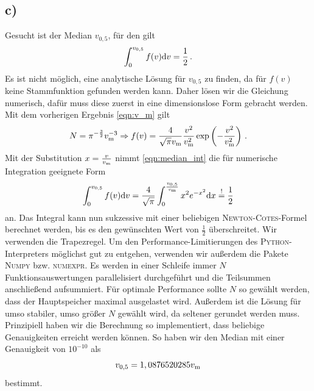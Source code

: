 \documentclass[a4paper, 11pt]{article}
\begin{document}
\subsection*{c)}
Gesucht ist der Median $v_{0,5}$, für den gilt
\begin{equation}
    \int_{0}^{v_{0,5}} f(v) \textup{d}v = \frac{1}{2} \,.
    \label{eqn:median_int}
\end{equation}
Es ist nicht möglich, eine analytische Lösung für $v_{0,5}$ zu finden, da für $f(v)$ keine Stammfunktion gefunden werden kann. Daher lösen wir die Gleichung numerisch, dafür muss diese zuerst in eine dimensionslose Form gebracht werden. Mit dem vorherigen Ergebnis \eqref{eqn:v_m} gilt
\begin{equation}
    N = \pi^{-\frac{3}{2}}v_\textup{m}^{-3} \Rightarrow f(v) = \frac{4}{\sqrt{\pi}v_\textup{m}}\frac{v^2}{v_\textup{m}^2} \exp\left(-\frac{v^2}{v_\textup{m}^2}\right)\,.
\end{equation}
Mit der Substitution $x = \frac{v}{v_\textup{m}}$ nimmt \eqref{eqn:median_int} die für numerische Integration geeignete Form
\begin{equation}
    \int_{0}^{v_{0,5}} f(v) \textup{d}v = \frac{4}{\sqrt{\pi}} \int_{0}^{\frac{v_{0,5}}{v_\textup{m}}} x^2 e^{-x^2} \textup{d}x \stackrel{\textup{!}}{=} \frac{1}{2}
\end{equation}
an. Das Integral kann nun sukzessive mit einer beliebigen \textsc{Newton}-\textsc{Cotes}-Formel berechnet werden, bis es den gewünschten Wert von $\frac{1}{2}$ überschreitet. Wir verwenden die Trapezregel. Um den Performance-Limitierungen des \textsc{Python}-Interpreters möglichst gut zu entgehen, verwenden wir außerdem die Pakete \textsc{Numpy} bzw. \textsc{numexpr}. Es werden in einer Schleife immer $N$ Funktionsauswertungen parallelisiert durchgeführt und die Teilsummen anschließend aufsummiert. Für optimale Performance sollte $N$ so gewählt werden, dass der Hauptspeicher maximal ausgelastet wird. Außerdem ist die Lösung für umso stabiler, umso größer $N$ gewählt wird, da seltener gerundet werden muss. Prinzipiell haben wir die Berechnung so implementiert, dass beliebige Genauigkeiten erreicht werden können. So haben wir den Median mit einer Genauigkeit von $10^{-10}$ als
\begin{equation}
    v_{0,5} = 1,0876520285 v_\textup{m}
\end{equation}
bestimmt.
\end{document}
